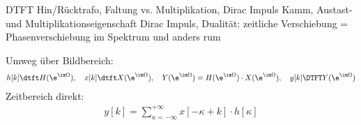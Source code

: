 \begin{Werkzeug}
DTFT Hin/Rücktrafo, Faltung vs. Multiplikation, Dirac Impuls Kamm,
Austast- und Multiplikationseigenschaft Dirac Impuls, Dualität:
zeitliche Verschiebung = Phasenverschiebung im Spektrum und anders rum
\end{Werkzeug}
\begin{Ansatz}
Umweg über Bildbereich:
\begin{align}
h[k]\dtft H(\e^{\im\Omega}),\quad x[k]\dtft X(\e^{\im\Omega}),\quad
Y(\e^{\im\Omega}) = H(\e^{\im\Omega}) \cdot X(\e^{\im\Omega}),\quad
y[k] \DTFT Y(\e^{\im\Omega})
\end{align}
Zeitbereich direkt:
\begin{align}
y[k] = \sum_{\kappa=-\infty}^{+\infty} x[-\kappa + k] \cdot h[\kappa]
\end{align}
\end{Ansatz}
